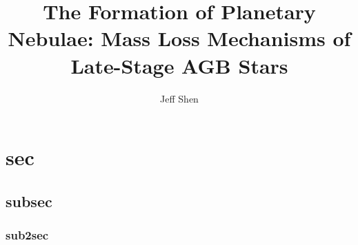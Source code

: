 \documentclass[twocolumn]{aastex63}
\begin{document}
\author{Jeff Shen}
\title{The Formation of Planetary Nebulae: Mass Loss Mechanisms of Late-Stage AGB Stars} 

\begin{abstract}
\lipsum[2]
\end{abstract}


\section{sec}
\lipsum

\subsection{subsec}
\lipsum
\subsubsection{sub2sec}
\lipsum
\end{document}
